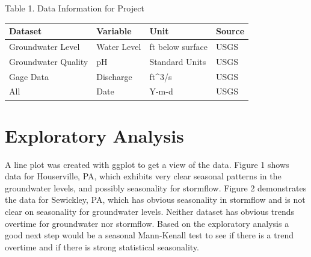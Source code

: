 \documentclass[
  12pt,
]{article}
\begin{document}
Table 1. Data Information for Project

\begin{longtable}[]{@{}llll@{}}
\toprule
Dataset & Variable & Unit & Source \\
\midrule
\endhead
Groundwater Level & Water Level & ft below surface & USGS \\
Groundwater Quality & pH & Standard Units & USGS \\
Gage Data & Discharge & ft\^{}3/s & USGS \\
All & Date & Y-m-d & USGS \\
\bottomrule
\end{longtable}

\newpage

\hypertarget{exploratory-analysis}{%
\section{Exploratory Analysis}\label{exploratory-analysis}}

A line plot was created with ggplot to get a view of the data. Figure 1
shows data for Houserville, PA, which exhibits very clear seasonal
patterns in the groundwater levels, and possibly seasonality for
stormflow. Figure 2 demonstrates the data for Sewickley, PA, which has
obvious seasonality in stormflow and is not clear on seasonality for
groundwater levels. Neither dataset has obvious trends overtime for
groundwater nor stormflow. Based on the exploratory analysis a good next
step would be a seasonal Mann-Kenall test to see if there is a trend
overtime and if there is strong statistical seasonality.
\end{document}
